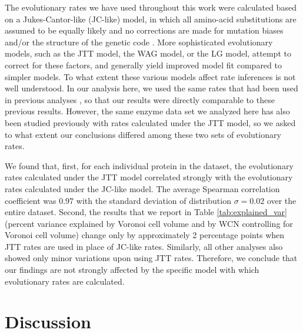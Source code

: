\documentclass[12pt]{article}
\begin{document}
The evolutionary rates we have used throughout this work were calculated based on a Jukes-Cantor-like (JC-like) model, in which all amino-acid substitutions are assumed to be equally likely and no corrections are made for mutation biases and/or the structure of the genetic code \cite{echave_relationship_2014}. More sophisticated evolutionary models, such as the JTT model\cite{jones_rapid_1992}, the WAG model\cite{WhelanGoldman2001}, or the LG model\cite{LeGascuel2008}, attempt to correct for these factors, and generally yield improved model fit compared to simpler models. To what extent these various models affect rate inferences is not well understood. In our analysis here, we used the same rates that had been used in previous analyses \cite{echave_relationship_2014,marcos_too_2015}, so that our results were directly comparable to these previous results. However, the same enzyme data set we analyzed here has also been studied previously with rates calculated under the JTT model\cite{yeh_site-specific_2014,huang_mechanistic_2014,yeh_local_2014}, so we asked to what extent our conclusions differed among these two sets of evolutionary rates.

We found that, first, for each individual protein in the dataset, the evolutionary rates calculated under the JTT model correlated strongly with the evolutionary rates calculated under the JC-like model. The average Spearman correlation coefficient was $0.97$ with the standard deviation of distribution $\sigma=0.02$ over the entire dataset. Second, the results that we report in Table \ref{tab:explained_var} (percent variance explained by Voronoi cell volume and by WCN controlling for Voronoi cell volume) change only by approximately 2 percentage points when JTT rates are used in place of JC-like rates. Similarly, all other analyses also showed only minor variations upon using JTT rates. Therefore, we conclude that our findings are not strongly affected by the specific model with which evolutionary rates are calculated.


\section*{Discussion}
\end{document}
